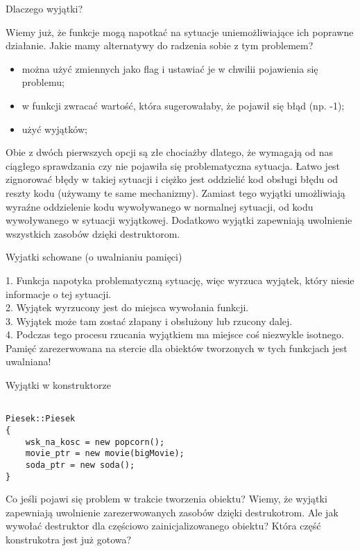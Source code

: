 \documentclass[notheorems, aspectratio=54]{beamer}
\begin{document}
\begin{frame}
 Dlaczego wyjątki?

Wiemy już, że funkcje mogą napotkać na sytuacje uniemożliwiające ich poprawne działanie.
Jakie mamy alternatywy do radzenia sobie z tym problemem?

  \begin{itemize}
  \item można użyć zmiennych jako flag i ustawiać je w chwilii pojawienia się problemu;
  \item w funkcji zwracać wartość, która sugerowałaby, że pojawił się błąd (np. -1);
  \item użyć wyjątków;
  \end{itemize}
  
  Obie z dwóch pierwszych opcji są złe chociażby dlatego, że wymagają od nas ciągłego sprawdzania czy nie pojawiła się problematyczna sytuacja.
  Łatwo jest zignorować błędy w takiej sytuacji i ciężko jest oddzielić kod obsługi błędu od reszty kodu (używamy te same mechanizmy).
  Zamiast tego wyjątki umożliwiają wyraźne oddzielenie kodu wywoływanego w normalnej sytuacji, od kodu wywoływanego w sytuacji wyjątkowej.
  Dodatkowo wyjątki zapewniają uwolnienie wszystkich zasobów dzięki destruktorom.
  \end{frame}


\begin{frame}
Wyjatki schowane (o uwalnianiu pamięci)

1. Funkcja napotyka problematyczną sytuację, więc wyrzuca wyjątek, który niesie informacje o tej sytuacji.\\
2. Wyjątek wyrzucony jest do miejsca wywołania funkcji.\\
3. Wyjątek może tam zostać złapany i obsłużony lub rzucony dalej.\\
4. Podczas tego procesu rzucania wyjątkiem ma miejsce coś niezwykle isotnego. Pamięć zarezerwowana na stercie dla obiektów tworzonych w tych funkcjach jest uwalniana!
\end{frame}

\begin{frame}[fragile]
Wyjątki w konstruktorze\\
\begin{lstlisting}

Piesek::Piesek 
{
	wsk_na_kosc = new popcorn();
	movie_ptr = new movie(bigMovie);
	soda_ptr = new soda();
}
\end{lstlisting}

Co jeśli pojawi się problem w trakcie tworzenia obiektu? 
Wiemy, że wyjątki zapewniają uwolnienie zarezerwowanych zasobów dzięki destrukotrom.
Ale jak wywołać destruktor dla częściowo zainicjalizowanego obiektu?
Która część konstrukotra jest już gotowa?

\end{frame}
\end{document}
